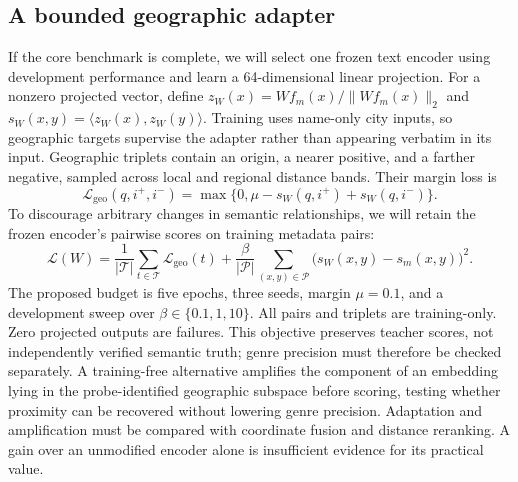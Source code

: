 \documentclass[10pt]{article}
\begin{document}
\subsection{A bounded geographic adapter}
If the core benchmark is complete, we will select one frozen text encoder using development performance and learn a 64-dimensional linear projection. For a nonzero projected vector, define $z_W(x)=Wf_m(x)/\lVert Wf_m(x)\rVert_2$ and $s_W(x,y)=\langle z_W(x),z_W(y)\rangle$. Training uses name-only city inputs, so geographic targets supervise the adapter rather than appearing verbatim in its input. Geographic triplets contain an origin, a nearer positive, and a farther negative, sampled across local and regional distance bands. Their margin loss is
\begin{equation}
\mathcal L_{\mathrm{geo}}(q,i^+,i^-)=
\max\{0,\mu-s_W(q,i^+)+s_W(q,i^-)\}.
\label{eq:triplet}
\end{equation}
To discourage arbitrary changes in semantic relationships, we will retain the frozen encoder's pairwise scores on training metadata pairs:
\begin{equation}
\mathcal L(W)=\frac1{|\mathcal T|}\sum_{t\in\mathcal T}\mathcal L_{\mathrm{geo}}(t)
 +\frac{\beta}{|\mathcal P|}\sum_{(x,y)\in\mathcal P}
   \big(s_W(x,y)-s_m(x,y)\big)^2.
\label{eq:adapter}
\end{equation}
The proposed budget is five epochs, three seeds, margin $\mu=0.1$, and a development sweep over $\beta\in\{0.1,1,10\}$. All pairs and triplets are training-only. Zero projected outputs are failures. This objective preserves teacher scores, not independently verified semantic truth; genre precision must therefore be checked separately. A training-free alternative amplifies the component of an embedding lying in the probe-identified geographic subspace before scoring, testing whether proximity can be recovered without lowering genre precision. Adaptation and amplification must be compared with coordinate fusion and distance reranking. A gain over an unmodified encoder alone is insufficient evidence for its practical value.
\end{document}
